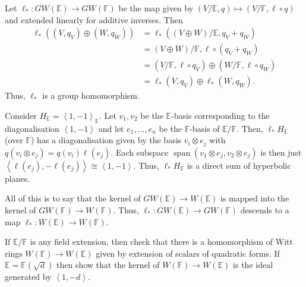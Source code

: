 \documentclass[12 pt, letterpaper]{hmcpset}
\begin{document}
\begin{solution} 
	Let $\ell_{*} : GW(\mathbb{E}) \to GW(\mathbb{F})$ be the map given by $(V/\mathbb{E}, q) \mapsto (V/\mathbb{F}, \ell \circ q)$ and extended linearly for additive inverses. Then
	\begin{align*}
		\ell_{*}((V, q_{V}) \oplus (W, q_{W})) & = \ell_{*}((V \oplus W)/\mathbb{E}, q_{V} + q_{W}) \\
						       & = (V \oplus W)/\mathbb{F}, \ell \circ (q_{V} + q_{W}) \\
						       & = (V/\mathbb{F}, \ell \circ q_{V}) \oplus (W/\mathbb{F}, \ell \circ q_{W}) \\
						       & = \ell_{*}(V, q_{V}) \oplus \ell_{*}(W, q_{W}).
	\end{align*}
	Thus, $\ell_{*}$ is a group homomorphism.

	Consider $H_{\mathbb{E}} = \left < 1, -1 \right >_{\mathbb{E}}$. Let $v_{1}, v_{2}$ be the $\mathbb{E}$-basis corresponding to the diagonalisation $\left < 1, -1 \right >$ and let $e_{1}, \dots, e_{n}$ be the $\mathbb{F}$-basis of $\mathbb{E} / \mathbb{F}$. Then, $\ell_{*} H_{\mathbb{E}}$ (over $\mathbb{F}$) has a diagonalisation given by the basis $v_{i} \otimes e_{j}$ with $q(v_{i} \otimes e_{j}) = q(v_{i}) \ell(e_{j})$. Each subspace $\operatorname{span}(v_{1} \otimes e_{j}, v_{2} \otimes e_{j})$ is then just $\left < \ell(e_{j}), -\ell(e_{j}) \right > \cong \left < 1, -1 \right >$. Thus, $\ell_{*} H_{\mathbb{E}}$ is a direct sum of hyperbolic planes.

	All of this is to say that the kernel of $GW(\mathbb{E}) \to W(\mathbb{E})$ is mapped into the kernel of $GW(\mathbb{F}) \to W(\mathbb{F})$. Thus, $\ell_{*} : GW(\mathbb{E}) \to GW(\mathbb{F})$ descends to a map $\ell_{*} : W(\mathbb{E}) \to W(\mathbb{F})$.
\end{solution}

\pagebreak

\begin{problem}[(3)]
	If $\mathbb{E} / \mathbb{F}$ is any field extension, then check that there is a homomorphism of Witt rings $W(\mathbb{F}) \to W(\mathbb{E})$ given by extension of scalars of quadratic forms. If $\mathbb{E} = \mathbb{F}(\sqrt{d})$ then show that the kernel of $W(\mathbb{F}) \to W(\mathbb{E})$ is the ideal generated by $\left < 1, -d \right >$.
\end{problem}
\end{document}
